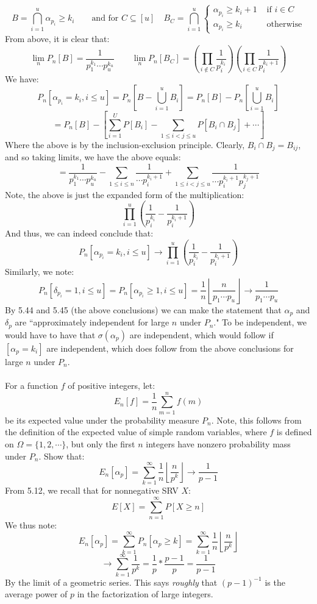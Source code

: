 \documentclass[12pt,a4paper]{article}
\newcommand{\1}[1]{\mathbbm{1}\left\{ #1 \right\}}
\newcommand{\floor}[1]{\left\lfloor #1 \right\rfloor}
\begin{document}
$$
	B = \bigcap_{i=1}^u \alpha_{p_i} \geq k_i \quad\quad
	\text{and for $C \subseteq [u]$} \quad
	B_C = \bigcap_{i=1}^u \begin{cases}
	\alpha_{p_i} \geq k_i + 1 & \text{ if $i \in C$}\\
	\alpha_{p_i} \geq k_i & \text{ otherwise}
	\end{cases}
$$
From above, it is clear that:
$$
	\lim_n P_n[B] = \frac{1}{p_1^{k_1} \cdots p_u^{k_u}}
	\quad\quad
	\lim_n P_n[B_C] = \left(\prod_{i \not\in C} \frac{1}{p_i^{k_i}}\right) 
	\left(\prod_{i \in C} \frac{1}{p_i^{k_i+1}}\right) 
$$
We have:
$$
	P_n\left[\alpha_{p_i} = k_i, i \leq u\right] = P_n\left[B - \bigcup_{i=1}^u B_i\right] =
	P_n[B] - P_n\left[\bigcup_{i=1}^u B_i\right]
$$
$$
	= P_n[B] - \left[\sum_{i=1}^U P[B_i] - \sum_{1 \leq i < j \leq u} P[B_i \cap B_j] + \cdots\right]
$$
Where the above is by the inclusion-exclusion principle. Clearly, $B_i \cap B_j = B_{ij}$, and so taking limits, we have the above equals:
$$
	= \frac{1}{p_1^{k_1} \cdots p_u^{k_u}} - \sum_{1 \leq i \leq n} \frac{1}{\cdots p_i^{k_i+1}} +
	\sum_{1 \leq i < j \leq u} \frac{1}{\cdots p_i^{k_i+1}p_j^{k_j+1}}
$$
Note, the above is just the expanded form of the multiplication:
$$
	\prod_{i=1}^u \left(\frac{1}{p_i^{k_i}} - \frac{1}{p_i^{k_i+1}}\right)
$$
And thus, we can indeed conclude that:
$$
	P_n\left[\alpha_{p_i} = k_i, i \leq u\right] \to \prod_{i=1}^u \left(\frac{1}{p_i^{k_i}} - \frac{1}{p_i^{k_i+1}}\right)
$$
Similarly, we note:
$$
	P_n\left[\delta_{p_i} = 1, i \leq u\right] =
	P_n[\alpha_{p_i} \geq 1, i \leq u] = \frac{1}{n}\floor{\frac{n}{p_1 \cdots p_u}} \to 
	\frac{1}{p_1 \cdots p_u}
$$
By 5.44 and 5.45 (the above conclusions) we can make the statement that $\alpha_p$ and $\delta_p$ are ``approximately independent for large $n$ under $P_n$." To be independent, we would have to have that $\sigma(\alpha_p)$ are independent, which would follow if $[\alpha_p = k_i]$ are independent, which does follow from the above conclusions for large $n$ under $P_n$.
\\\\
For a function $f$ of positive integers, let:
$$
	E_n[f] = \frac{1}{n} \sum_{m=1}^n f(m)
$$
be its expected value under the probability measure $P_n$. Note, this follows from the definition of the expected value of simple random variables, where $f$ is defined on $\Omega = \{1, 2, \cdots\}$, but only the first $n$ integers have nonzero probability mass under $P_n$. Show that:
$$
	E_n[\alpha_p] = \sum_{k=1}^\infty \frac{1}{n} \floor{\frac{n}{p^k}} \to \frac{1}{p-1}
$$
From 5.12, we recall that for nonnegative SRV $X$:
$$
	E[X] = \sum_{n=1}^\infty P[X \geq n]
$$
We thus note:
$$
	E_n[\alpha_p] = \sum_{k=1}^\infty P_n[\alpha_p \geq k] = \sum_{k=1}^\infty \frac{1}{n}\floor{\frac{n}{p^k}}
$$
$$
	\to \sum_{k=1}^\infty \frac{1}{p^k} = \frac{1}{p} * \frac{p-1}{p} = \frac{1}{p-1}
$$
By the limit of a geometric series. This says \textit{roughly} that $(p-1)^{-1}$ is the average power of $p$ in the factorization of large integers.
\end{document}
